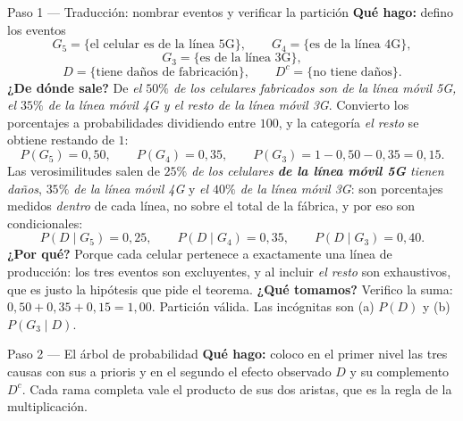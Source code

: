 \documentclass[11pt]{article}
\begin{document}
\begin{sol}

\begin{paso}{Paso 1 --- Traducción: nombrar eventos y verificar la partición}
\textbf{Qué hago:} defino los eventos
\[
G_5=\{\text{el celular es de la línea 5G}\},\qquad G_4=\{\text{es de la línea 4G}\},
\]
\[
G_3=\{\text{es de la línea 3G}\},
\]
\[
D=\{\text{tiene daños de fabricación}\},\qquad D^{c}=\{\text{no tiene daños}\}.
\]
\textbf{¿De dónde sale?} De \emph{el $50\%$ de los celulares fabricados son de la línea móvil 5G, el $35\%$ de la línea móvil 4G y el resto de la línea móvil 3G}. Convierto los porcentajes a probabilidades dividiendo entre $100$, y la categoría \emph{el resto} se obtiene restando de $1$:
\[
P(G_5)=0,50,\qquad P(G_4)=0,35,\qquad P(G_3)=1-0,50-0,35=0,15 .
\]
Las verosimilitudes salen de \emph{$25\%$ de los celulares \textbf{de la línea móvil 5G} tienen daños}, \emph{$35\%$ de la línea móvil 4G} y \emph{el $40\%$ de la línea móvil 3G}: son porcentajes medidos \emph{dentro} de cada línea, no sobre el total de la fábrica, y por eso son condicionales:
\[
P(D\mid G_5)=0,25,\qquad P(D\mid G_4)=0,35,\qquad P(D\mid G_3)=0,40 .
\]
\textbf{¿Por qué?} Porque cada celular pertenece a exactamente una línea de producción: los tres eventos son excluyentes, y al incluir \emph{el resto} son exhaustivos, que es justo la hipótesis que pide el teorema.
\textbf{¿Qué tomamos?} Verifico la suma: $0,50+0,35+0,15=1,00$. Partición válida. Las incógnitas son (a) $P(D)$ y (b) $P(G_3\mid D)$.
\end{paso}

\begin{paso}{Paso 2 --- El árbol de probabilidad}
\textbf{Qué hago:} coloco en el primer nivel las tres causas con sus a prioris y en el segundo el efecto observado $D$ y su complemento $D^{c}$. Cada rama completa vale el producto de sus dos aristas, que es la regla de la multiplicación.

\begin{center}
\shorthandoff{<>}
\end{center}
\end{paso}
\end{sol}
\end{document}
